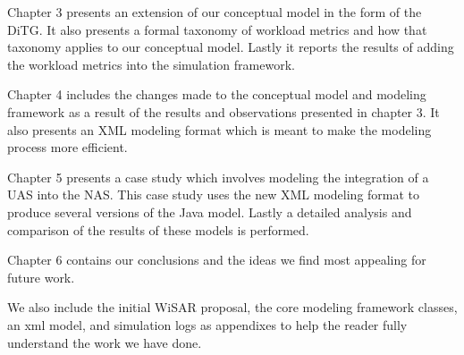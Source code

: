 Chapter 3 presents an extension of our conceptual model in the form of the DiTG.  It also presents a formal taxonomy of workload metrics and how that taxonomy applies to our conceptual model.  Lastly it reports the results of adding the workload metrics into the simulation framework.

Chapter 4 includes the changes made to the conceptual model and modeling framework as a result of the results and observations presented in chapter 3.  It also presents an XML modeling format which is meant to make the modeling process more efficient.

Chapter 5 presents a case study which involves modeling the integration of a UAS into the NAS.  This case study uses the new XML modeling format to produce several versions of the Java model.  Lastly a detailed analysis and comparison of the results of these models is performed.

Chapter 6 contains our conclusions and the ideas we find most appealing for future work.

We also include the initial WiSAR proposal, the core modeling framework classes, an xml model, and simulation logs as appendixes to help the reader fully understand the work we have done.
